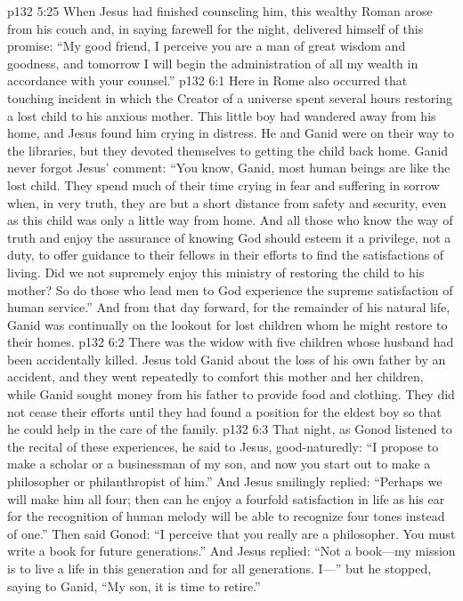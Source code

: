 \pc \vs p132 5:25 When Jesus had finished counseling him, this wealthy Roman arose from his couch and, in saying farewell for the night, delivered himself of this promise: “My good friend, I perceive you are a man of great wisdom and goodness, and tomorrow I will begin the administration of all my wealth in accordance with your counsel.”
\vs p132 6:1 Here in Rome also occurred that touching incident in which the Creator of a universe spent several hours restoring a lost child to his anxious mother. This little boy had wandered away from his home, and Jesus found him crying in distress. He and Ganid were on their way to the libraries, but they devoted themselves to getting the child back home. Ganid never forgot Jesus’ comment: \textcolor{ubdarkred}{“You know, Ganid, most human beings are like the lost child. They spend much of their time crying in fear and suffering in sorrow when, in very truth, they are but a short distance from safety and security, even as this child was only a little way from home. And all those who know the way of truth and enjoy the assurance of knowing God should esteem it a privilege, not a duty, to offer guidance to their fellows in their efforts to find the satisfactions of living. Did we not supremely enjoy this ministry of restoring the child to his mother? So do those who lead men to God experience the supreme satisfaction of human service.”} And from that day forward, for the remainder of his natural life, Ganid was continually on the lookout for lost children whom he might restore to their homes.
\pc \vs p132 6:2 There was the widow with five children whose husband had been accidentally killed. Jesus told Ganid about the loss of his own father by an accident, and they went repeatedly to comfort this mother and her children, while Ganid sought money from his father to provide food and clothing. They did not cease their efforts until they had found a position for the eldest boy so that he could help in the care of the family.
\pc \vs p132 6:3 That night, as Gonod listened to the recital of these experiences, he said to Jesus, good\hyp{}naturedly: “I propose to make a scholar or a businessman of my son, and now you start out to make a philosopher or philanthropist of him.” And Jesus smilingly replied: \textcolor{ubdarkred}{“Perhaps we will make him all four; then can he enjoy a fourfold satisfaction in life as his ear for the recognition of human melody will be able to recognize four tones instead of one.”} Then said Gonod: “I perceive that you really are a philosopher. You must write a book for future generations.” And Jesus replied: \textcolor{ubdarkred}{“Not a book---my mission is to live a life in this generation and for all generations. I---”} but he stopped, saying to Ganid, \textcolor{ubdarkred}{“My son, it is time to retire.”}
